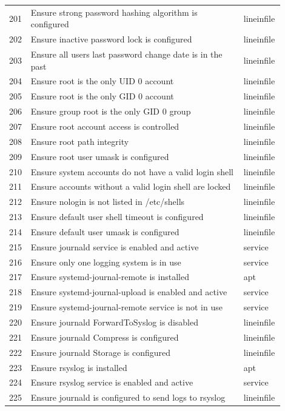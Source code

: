 \begin{longtable}{|p{0.05\linewidth}|p{0.75\linewidth}|p{0.1\linewidth}|}
201 & Ensure strong password hashing algorithm is configured & lineinfile \\
202 & Ensure inactive password lock is configured & lineinfile \\
203 & Ensure all users last password change date is in the past & lineinfile \\
204 & Ensure root is the only UID 0 account & lineinfile \\
205 & Ensure root is the only GID 0 account & lineinfile \\
206 & Ensure group root is the only GID 0 group & lineinfile \\
207 & Ensure root account access is controlled & lineinfile \\
208 & Ensure root path integrity & lineinfile \\
209 & Ensure root user umask is configured & lineinfile \\
210 & Ensure system accounts do not have a valid login shell & lineinfile \\
211 & Ensure accounts without a valid login shell are locked & lineinfile \\
212 & Ensure nologin is not listed in /etc/shells & lineinfile \\
213 & Ensure default user shell timeout is configured & lineinfile \\
214 & Ensure default user umask is configured & lineinfile \\
215 & Ensure journald service is enabled and active & service \\
216 & Ensure only one logging system is in use & service \\
217 & Ensure systemd-journal-remote is installed & apt \\
218 & Ensure systemd-journal-upload is enabled and active & service \\
219 & Ensure systemd-journal-remote service is not in use & service \\
220 & Ensure journald ForwardToSyslog is disabled & lineinfile \\
221 & Ensure journald Compress is configured & lineinfile \\
222 & Ensure journald Storage is configured & lineinfile \\
223 & Ensure rsyslog is installed & apt \\
224 & Ensure rsyslog service is enabled and active & service \\
225 & Ensure journald is configured to send logs to rsyslog & lineinfile \\

\end{longtable}
